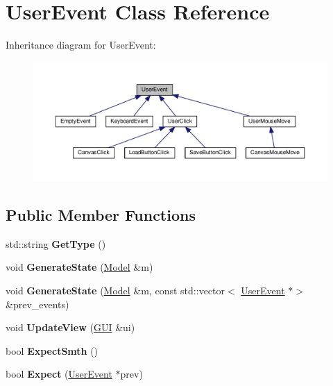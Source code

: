 \hypertarget{classUserEvent}{}\section{User\+Event Class Reference}
\label{classUserEvent}


Inheritance diagram for User\+Event\+:\nopagebreak
\begin{figure}[H]
\begin{center}
\leavevmode
\includegraphics[width=350pt]{classUserEvent__inherit__graph}
\end{center}
\end{figure}
\subsection*{Public Member Functions}
\begin{DoxyCompactItemize}
\item 
\mbox{\label{classUserEvent_ad2c66a7c1dbf277ad147fd4336f5f60a}} 
std\+::string {\bfseries Get\+Type} ()
\item 
\mbox{\label{classUserEvent_a9e8a9f0fd1f200fbd099d02dae3792cb}} 
void {\bfseries Generate\+State} (\hyperlink{classModel}{Model} \&m)
\item 
\mbox{\label{classUserEvent_a196963d228e1cdd314043dfa3bdc8f2d}} 
void {\bfseries Generate\+State} (\hyperlink{classModel}{Model} \&m, const std\+::vector$<$ \hyperlink{classUserEvent}{User\+Event} $\ast$$>$ \&prev\+\_\+events)
\item 
\mbox{\label{classUserEvent_ae844d6d647e6dd6bcc6d81b3f959782e}} 
void {\bfseries Update\+View} (\hyperlink{classGUI}{G\+UI} \&ui)
\item 
\mbox{\label{classUserEvent_a394a8268528c11de6b3e358d578f8d78}} 
bool {\bfseries Expect\+Smth} ()
\item 
\mbox{\label{classUserEvent_a1e0c7ec71a63e51bd2f231c3a9cccf50}} 
bool {\bfseries Expect} (\hyperlink{classUserEvent}{User\+Event} $\ast$prev)
\end{DoxyCompactItemize}
